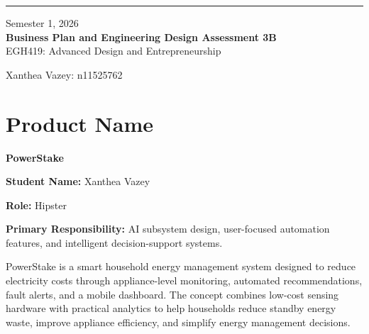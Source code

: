 \documentclass[11pt, twoside, a4paper]{article}
\newcommand{\TitleName}{Business Plan and Engineering Design Assessment 3B}
\newcommand{\unitTime}{Semester 1, 2026}
\newcommand{\unitName}{EGH419: Advanced Design and Entrepreneurship}
\newcommand{\documentAuthors}{Xanthea Vazey: n11525762}
\begin{document}
\begin{titlepage}
    \thispagestyle{empty}
    \vspace*{0.2\textheight}
    
    \noindent
    \begin{minipage}[t]{0.03\textwidth}
        \rule[-25ex]{1pt}{140pt}   %
    \end{minipage}
    \hspace{1em}
    \begin{minipage}[t]{0.9\textwidth}
        \raggedright
        \normalsize{\unitTime} \\[2ex]
        \Huge\textbf{\TitleName} \\[2ex]
        \normalsize{\unitName}
    \end{minipage}
    
    \vfill
    \begin{flushleft}
        \documentAuthors
    \end{flushleft}
\end{titlepage}

\newpage
{}


\section{Product Name}

\textbf{PowerStake}

\textbf{Student Name:} Xanthea Vazey

\textbf{Role:} Hipster

\textbf{Primary Responsibility:} AI subsystem design, user-focused automation features, and intelligent decision-support systems.

PowerStake is a smart household energy management system designed to reduce electricity costs through appliance-level monitoring, automated recommendations, 
fault alerts, and a mobile dashboard. The concept combines low-cost sensing hardware with practical analytics to help households reduce standby energy waste, 
improve appliance efficiency, and simplify energy management decisions.

\vspace{0.5em}
\end{document}
